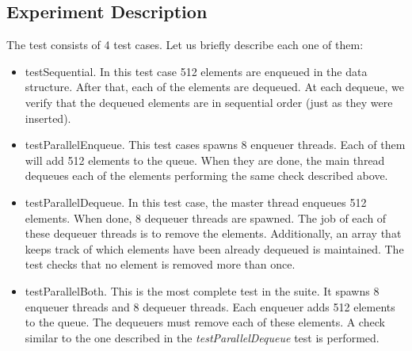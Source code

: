 \subsection{Experiment Description}
\par
The test consists of 4 test cases. Let us briefly describe each one of them:
\par
\begin{itemize}
\item testSequential. In this test case 512 elements are enqueued in the data
structure. After that, each of the elements are dequeued. At each dequeue, we
verify that the dequeued elements are in sequential order (just as they were
inserted).
\item testParallelEnqueue. This test cases spawns $8$ enqueuer threads. Each of
them will add 512 elements to the queue. When they are done, the main thread
dequeues each of the elements performing the same check described above.
\item testParallelDequeue. In this test case, the master thread enqueues 512
elements. When done, 8 dequeuer threads are spawned. The job of each of these
dequeuer threads is to remove the elements. Additionally, an array that keeps
track of which elements have been already dequeued is maintained. The test
checks that no element is removed more than once.
\item testParallelBoth. This is the most complete test in the suite. It spawns
8 enqueuer threads and 8 dequeuer threads. Each enqueuer adds 512 elements to
the queue. The dequeuers must remove each of these elements. A check similar to
the one described in the \textit{testParallelDequeue} test is performed.
\end{itemize}
\par

